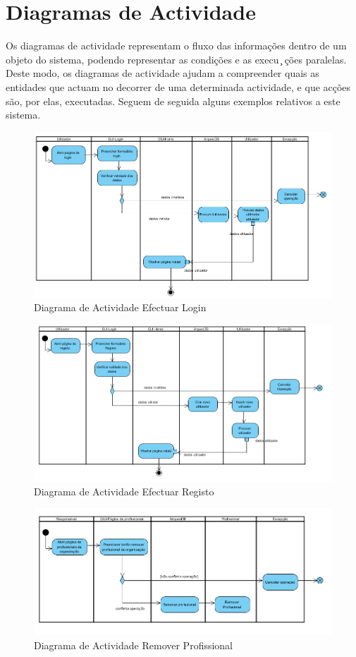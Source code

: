 \documentclass[12pt,a4paper]{article}
\begin{document}
\clearpage
\section{Diagramas de Actividade} 
 Os diagramas de actividade representam o fluxo das informações dentro de um objeto do sistema, podendo representar as condições e as execu ̧
ções paralelas. Deste modo, os diagramas de actividade ajudam a compreender quais as entidades que actuam no decorrer de uma
determinada actividade, e que acções são, por elas, executadas. Seguem de seguida alguns
exemplos relativos a este sistema.
 
\begin{figure}[h!]
\centering
\includegraphics[scale=0.7]{actividade/lofin}
\caption{Diagrama de Actividade Efectuar Login} 
\end{figure} 

\begin{figure}[h!]
\centering
\includegraphics[scale=0.7]{actividade/registo}
\caption{Diagrama de Actividade Efectuar Registo} 
\end{figure} 

\begin{figure}[h!]
\centering
\includegraphics[scale=0.7]{actividade/removerprofissional}
\caption{Diagrama de Actividade Remover Profissional} 
\end{figure} 
\end{document}
